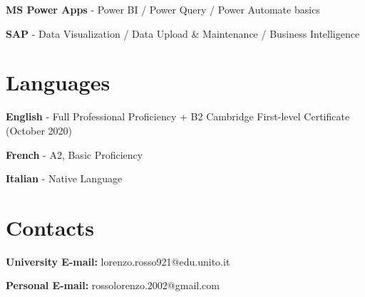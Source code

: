 \documentclass[10pt,a4paper]{article}
\begin{document}
\par

\textbf{MS Power Apps}
{\small
- Power BI / Power Query / Power Automate basics }

\par

\textbf{SAP}
{\small
- Data Visualization / Data Upload \& Maintenance / Business Intelligence
}



\section*{Languages}

\vspace{6pt}

\textbf{English}
{\small
- Full Professional Proficiency + B2 Cambridge First-level Certificate (October 2020)
}

\par

\textbf{French}
{\small
- A2, Basic Proficiency
}

\par

\textbf{Italian}
{\small
- Native Language
}


\section*{Contacts}
\vspace{6pt}
\par \textbf{University E-mail:} \small lorenzo.rosso921@edu.unito.it
\par \textbf{Personal E-mail:} \small rossolorenzo.2002@gmail.com
\end{document}
